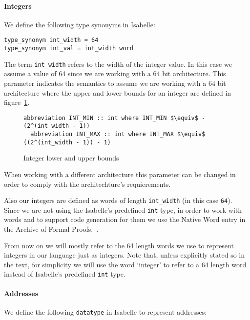 \paragraph{Integers}

We define the following type synonyms in Isabelle:

\begin{lstlisting}[frame=single]
type_synonym int_width = 64
type_synonym int_val = int_width word
\end{lstlisting}


The term \verb|int_width| refers to the width of the integer value.
In this case we assume a value of 64 since we are working with a 64 bit architecture.
This parameter indicates the semantics to assume we are working with a 64 bit architecture where the upper and lower bounds for an integer are defined in figure~\ref{fig:int_bounds}.

\begin{figure}
  \caption{Integer lower and upper bounds}
  \label{fig:int_bounds}

  \begin{lstlisting}[frame=single, mathescape=true]
  abbreviation INT_MIN :: int where INT_MIN $\equiv$ - (2^(int_width - 1))
  abbreviation INT_MAX :: int where INT_MAX $\equiv$  ((2^(int_width - 1)) - 1)
  \end{lstlisting}
\end{figure}

When working with a different architecture this parameter can be changed in order to comply with the architechture's requierements.

Also our integers are defined as words of length \verb|int_width| (in this case \verb|64|).
Since we are not using the Isabelle's predefined \verb|int| type, in order to work with words and to support code generation for them we use the Native Word entry in the Archive of Formal Proofs.~\parencite{Native_Word-AFP}.

From now on we will mostly refer to the 64 length words we use to represent integers in our language just as integers.
Note that, unless explicitly stated so in the text, for simplicity we will use the word `integer' to refer to a 64 length word instead of Isabelle's predefined \verb|int| type.

\paragraph{Addresses}

We define the following \verb|datatype| in Isabelle to represent addresses:

